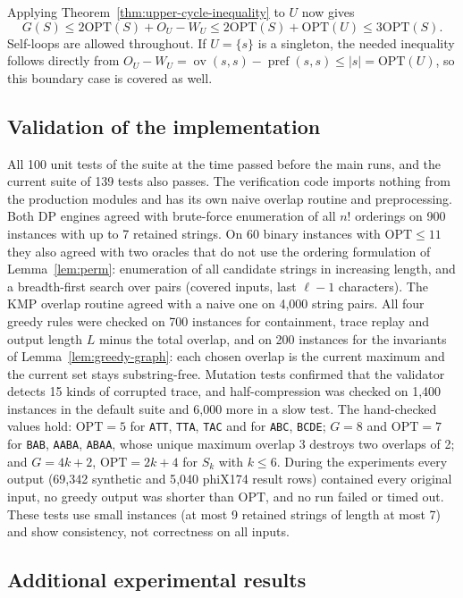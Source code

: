 \documentclass[11pt,a4paper]{article}   %
\theoremstyle{compact}
\theoremstyle{compactdef}
\newcommand{\OPT}{\mathrm{OPT}}
\newcommand{\GR}{G}                         %
\newcommand{\ov}{\operatorname{ov}}         %
\newcommand{\str}[1]{\texttt{#1}}           %
\begin{document}
Applying Theorem~\ref{thm:upper-cycle-inequality} to $U$ now gives
\[
 G(S)\le2\OPT(S)+O_U-W_U
       \le2\OPT(S)+\OPT(U)
       \le3\OPT(S).
\]
Self-loops are allowed throughout. If $U=\{s\}$ is a singleton, the
needed inequality follows directly from
$O_U-W_U=\ov(s,s)-\operatorname{pref}(s,s)\le|s|=\OPT(U)$,
so this boundary case is covered as well.

\subsection{Validation of the implementation}\label{app:validation}
All 100 unit tests of the suite at the time passed before the main runs,
and the current suite of 139 tests also passes. The verification code
imports nothing from the production modules and has its own naive overlap
routine and preprocessing. Both DP engines agreed with brute-force
enumeration of all $n!$ orderings on 900 instances with up to 7 retained
strings. On 60 binary instances with $\OPT\le11$ they also agreed with two
oracles that do not use the ordering formulation of Lemma~\ref{lem:perm}:
enumeration of all candidate strings in increasing length, and a
breadth-first search over pairs (covered inputs, last $\ell-1$ characters).
The KMP overlap routine agreed with a naive one on 4{,}000 string pairs. All
four greedy rules were checked on 700 instances for containment, trace
replay and output length $L$ minus the total overlap, and on 200 instances
for the invariants of Lemma~\ref{lem:greedy-graph}: each chosen overlap is
the current maximum and the current set stays substring-free. Mutation tests
confirmed that the validator detects 15 kinds of corrupted trace, and
half-compression was checked on 1{,}400 instances in the default suite and
6{,}000 more in a slow test. The hand-checked values hold: $\OPT=5$ for
\str{ATT}, \str{TTA}, \str{TAC} and for \str{ABC}, \str{BCDE}; $\GR=8$ and
$\OPT=7$ for \str{BAB}, \str{AABA}, \str{ABAA}, whose unique maximum overlap
3 destroys two overlaps of 2; and $\GR=4k+2$, $\OPT=2k+4$ for $S_k$ with
$k\le6$. During the experiments every output (69{,}342 synthetic and
5{,}040 phiX174 result rows) contained every original input, no greedy
output was shorter than $\OPT$, and no run failed or timed out. These tests
use small instances (at most 9 retained strings of length at most 7) and
show consistency, not correctness on all inputs.

\subsection{Additional experimental results}\label{app:extra}
\end{document}
